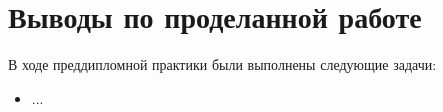 \documentclass[a4paper, 14pt]{extreport}
\begin{document}




    \chapter{Выводы по проделанной работе}
    В ходе преддипломной практики были выполнены следующие задачи:
    \begin{itemize}
        \item ...
    \end{itemize}
\end{document}

